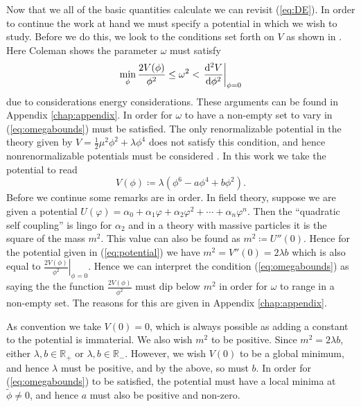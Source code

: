 Now that we all of the basic quantities calculate we can revisit (\ref{eq:DE}). In order to continue the work at hand we must specify a potential in which we wish to study. Before we do this, we look to the conditions set forth on $V$ as shown in \cite{coleman}. Here Coleman shows the parameter $\omega$ must satisfy
\begin{equation}\label{eq:omegabounds}
\min_\phi{\frac{2V(\phi)}{\phi^2}}\leq \omega^2 < \left.\dv[2]{V}{\phi}\right|_{\phi = 0}
\end{equation}
due to considerations energy considerations. These arguments can be found in Appendix \ref{chap:appendix}. In order for $\omega$ to have a non-empty set to vary in (\ref{eq:omegabounds}) must be satisfied. The only renormalizable potential in the theory given by $V = \frac{1}{2}\mu^2\phi^2 + \lambda \phi^4$ does not satisfy this condition, and hence nonrenormalizable potentials must be considered \cite{coleman}. In this work we take the potential to read
\begin{equation}\label{eq:potential}
V(\phi)\coloneqq \lambda\left(\phi^6 - a\phi^4 + b\phi^2\right).
\end{equation}
Before we continue some remarks are in order. In field theory, suppose we are given a potential $U(\varphi) = \alpha_0 + \alpha_1\varphi + \alpha_2\varphi^2 + \cdots + \alpha_n\varphi^n$. Then the ``quadratic self coupling'' is lingo for $\alpha_2$ and in a theory with massive particles it is the square of the mass $m^2$. This value can also be found as $m^2\coloneqq U''(0)$. Hence for the potential given in (\ref{eq:potential}) we have $m^2 = V''(0) = 2\lambda b$ which is also equal to $\left.\frac{2V(\phi)}{\phi^2}\right|_{\phi = 0}$. Hence we can interpret the condition (\ref{eq:omegabounds}) as saying the the function $\frac{2V(\phi)}{\phi^2}$ must dip below $m^2$ in order for $\omega$ to range in a non-empty set. The reasons for this are given in Appendix \ref{chap:appendix}.

As convention we take $V(0) = 0$, which is always possible as adding a constant to the potential is immaterial. We also wish $m^2$ to be positive. Since $m^2 = 2\lambda b$, either $\lambda,b\in\mathbb{R}_+$ or $\lambda,b\in\mathbb{R}_-$. However, we wish $V(0)$ to be a global minimum, and hence $\lambda$ must be positive, and by the above, so must $b$. In order for (\ref{eq:omegabounds}) to be satisfied, the potential must have a local minima at $\tilde{\phi}\neq 0$, and hence $a$ must also be positive and non-zero.

